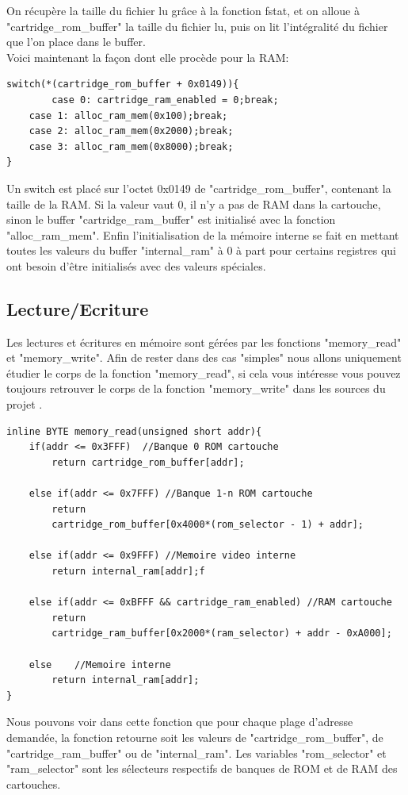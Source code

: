 \documentclass[french]{report}
\begin{document}
On récupère la taille du fichier lu grâce à la fonction fstat, et on alloue à "cartridge\_rom\_buffer" la taille du fichier lu, puis on lit l'intégralité du fichier que l'on place dans le buffer.\\
Voici maintenant la façon dont elle procède pour la RAM:
\begin{lstlisting}
switch(*(cartridge_rom_buffer + 0x0149)){
       	case 0: cartridge_ram_enabled = 0;break;
	case 1: alloc_ram_mem(0x100);break;
	case 2: alloc_ram_mem(0x2000);break;
	case 3: alloc_ram_mem(0x8000);break;
}
\end{lstlisting}
Un switch est placé sur l'octet 0x0149 de "cartridge\_rom\_buffer", contenant la taille de la RAM. Si la valeur vaut 0, il n'y a pas de RAM dans la cartouche, sinon le buffer "cartridge\_ram\_buffer" est initialisé avec la fonction "alloc\_ram\_mem".
Enfin l'initialisation de la mémoire interne se fait en mettant toutes les valeurs du buffer "internal\_ram" à 0 à part pour certains registres qui ont besoin d'être initialisés avec des valeurs spéciales.
\subsection{Lecture/Ecriture}
Les lectures et écritures en mémoire sont gérées par les fonctions "memory\_read" et "memory\_write". Afin de rester dans des cas "simples" nous allons uniquement étudier le corps de la fonction "memory\_read", si cela vous intéresse vous pouvez toujours retrouver le corps de la fonction "memory\_write" dans les sources du projet \cite{github}.
\begin{lstlisting}
inline BYTE memory_read(unsigned short addr){
	if(addr <= 0x3FFF) 	//Banque 0 ROM cartouche
		return cartridge_rom_buffer[addr];

	else if(addr <= 0x7FFF) //Banque 1-n ROM cartouche
		return 
		cartridge_rom_buffer[0x4000*(rom_selector - 1) + addr];

	else if(addr <= 0x9FFF) //Memoire video interne
		return internal_ram[addr];f

	else if(addr <= 0xBFFF && cartridge_ram_enabled) //RAM cartouche
		return 
		cartridge_ram_buffer[0x2000*(ram_selector) + addr - 0xA000];

	else 	//Memoire interne
		return internal_ram[addr];
}
\end{lstlisting}
Nous pouvons voir dans cette fonction que pour chaque plage d'adresse demandée, la fonction retourne soit les valeurs de "cartridge\_rom\_buffer", de "cartridge\_ram\_buffer" ou de "internal\_ram".
Les variables "rom\_selector" et "ram\_selector" sont les sélecteurs respectifs de banques de ROM et de RAM des cartouches.
\end{document}
